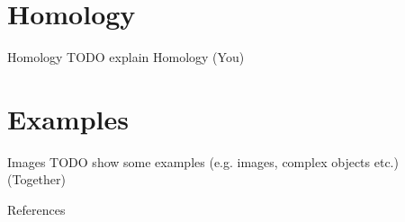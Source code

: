 \documentclass[aspectratio=169,xcolor=dvipsnames]{beamer}
\begin{document}
\section{Homology}

\begin{frame}{Homology}
    TODO explain Homology (You)
\end{frame}

\section{Examples}

\begin{frame}{Images}
    TODO show some examples (e.g. images, complex objects etc.) (Together)
\end{frame}

\begin{frame}{References}
    \footnotesize
    
    
\end{frame}
\end{document}
